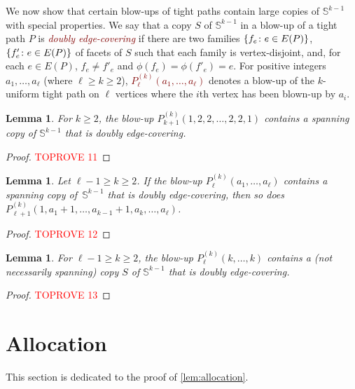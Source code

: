 \documentclass[12pt,reqno]{amsart}
\theoremstyle{plain}
\newtheorem{lemma}[theorem]{Lemma}
\theoremstyle{definition}
\numberwithin{equation}{section}
\DeclarePairedDelimiter{\set}{\{}{\}}
\renewcommand{\geq}{\geqslant}
\newcommand{\defn}[1]{\textcolor{Maroon}{\emph{#1}}}
\newcommand{\bS}{\mathbb{S}}
\begin{document}
	We now show that certain blow-ups of tight paths contain large copies of $\bS^{k - 1}$ with special properties. We say that a copy $S$ of $\bS^{k - 1}$ in a blow-up of a tight path $P$ is \defn{doubly edge-covering} if there are two families $\set{f_e \colon e \in E(P)}$, $\set{f'_e \colon e \in E(P)}$ of facets of $S$ such that each family is vertex-disjoint, and, for each $e \in E(P)$, $f_e \neq f'_e$ and $\phi(f_e) = \phi(f'_e) = e$. For positive integers $a_1, \dotsc, a_\ell$ (where $\ell \geq k \geq 2$), \defn{$P_\ell^{(k)}(a_1, \dotsc, a_\ell)$} denotes a blow-up of the $k$-uniform tight path on $\ell$ vertices where the $i$th vertex has been blown-up by $a_i$.
	
	\begin{lemma}\label{lem:thin-path}
		For $k\geq 2$, the blow-up $P_{k + 1}^{(k)}(1, 2, 2, \dotsc, 2, 2, 1)$ contains a spanning copy of $\bS^{k - 1}$ that is doubly edge-covering.
	\end{lemma}
	\begin{proof}\textcolor{red}{TOPROVE 11}\end{proof}
	
	\begin{lemma}\label{lem:growing-path}
		Let $\ell - 1 \geq k \geq 2$.
		If the blow-up  $P_\ell^{(k)}(a_1, \dotsc, a_\ell)$ contains a spanning copy of~$\bS^{k - 1}$ that is doubly edge-covering, then so does $P_{\ell + 1}^{(k)}(1, a_1 + 1, \dotsc, a_{k - 1} + 1, a_k, \dotsc, a_\ell)$.
	\end{lemma}
	\begin{proof}\textcolor{red}{TOPROVE 12}\end{proof}
	
	\begin{lemma}\label{lem:tightpathsphere}
		For $\ell - 1 \geq k \geq 2$, the blow-up $P_\ell^{(k)}(k, \dotsc, k)$ contains a \textup{(}not necessarily spanning\textup{)} copy $S$ of $\bS^{k - 1}$ that is doubly edge-covering.
	\end{lemma}
	
	\begin{proof}\textcolor{red}{TOPROVE 13}\end{proof}
	
	
	
	
	
	\section{Allocation}
	\label{sec:allocation}
	
	This section is dedicated to the proof of \cref{lem:allocation}.
	
\end{document}
